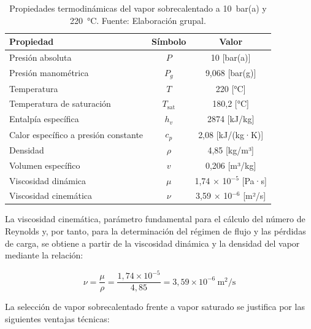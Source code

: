 \documentclass[12pt]{article}
\begin{document}
\begin{table}[H]
	\centering
	\caption{Propiedades termodinámicas del vapor sobrecalentado a 10~bar(a) y 220~°C. Fuente: Elaboración grupal.}
	\label{tab:propiedades-vapor-sobrecalentado}
	\begin{tabular}{lcc}
		\toprule
		\textbf{Propiedad}                   & \textbf{Símbolo} & \textbf{Valor}          \\
		\midrule
		Presión absoluta                     & $P$              & 10 [bar(a)]             \\
		Presión manométrica                  & $P_g$            & 9,068 [bar(g)]          \\
		Temperatura                          & $T$              & 220 [°C]                \\
		Temperatura de saturación            & $T_{\text{sat}}$ & 180,2 [°C]              \\
		Entalpía específica                  & $h_v$            & 2874 [kJ/kg]            \\
		Calor específico a presión constante & $c_p$            & 2,08 [kJ/(kg·K)]        \\
		Densidad                             & $\rho$           & 4,85 [kg/m³]            \\
		Volumen específico                   & $v$              & 0,206 [m³/kg]           \\
		Viscosidad dinámica                  & $\mu$            & 1,74 × 10$^{-5}$ [Pa·s] \\
		Viscosidad cinemática                & $\nu$            & 3,59 × 10$^{-6}$ [m²/s] \\
		\bottomrule
	\end{tabular}
\end{table}

La viscosidad cinemática, parámetro fundamental para el cálculo del número de Reynolds y, por tanto, para la determinación del régimen de flujo y las pérdidas de carga, se obtiene a partir de la viscosidad dinámica y la densidad del vapor mediante la relación:

\begin{equation}
	\nu = \frac{\mu}{\rho} = \frac{1{,}74 \times 10^{-5}}{4{,}85} = 3{,}59 \times 10^{-6} \ \text{m}^2\text{/s}
	\label{eq:viscosidad-cinematica}
\end{equation}

La selección de vapor sobrecalentado frente a vapor saturado se justifica por las siguientes ventajas técnicas:
\end{document}
